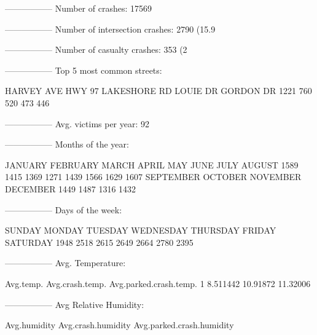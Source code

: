 \documentclass[11pt, a4paper]{article}
\begin{document}
\begin{Schunk}
\begin{Soutput}
-----------------
Number of crashes: 17569
\end{Soutput}
\begin{Soutput}
-----------------
Number of intersection crashes: 2790 (15.9%
\end{Soutput}
\begin{Soutput}
-----------------
Number of casualty crashes: 353 (2%
\end{Soutput}
\begin{Soutput}
-----------------
Top 5 most common streets:
\end{Soutput}
\begin{Soutput}
  HARVEY AVE       HWY 97 LAKESHORE RD     LOUIE DR    GORDON DR 
        1221          760          520          473          446 
\end{Soutput}
\begin{Soutput}
-----------------
Avg. victims per year: 92
\end{Soutput}
\begin{Soutput}
-----------------
Months of the year:
\end{Soutput}
\begin{Soutput}
  JANUARY  FEBRUARY     MARCH     APRIL       MAY      JUNE      JULY    AUGUST 
     1589      1415      1369      1271      1439      1566      1629      1607 
SEPTEMBER   OCTOBER  NOVEMBER  DECEMBER 
     1449      1487      1316      1432 
\end{Soutput}
\begin{Soutput}
-----------------
Days of the week:
\end{Soutput}
\begin{Soutput}
   SUNDAY    MONDAY   TUESDAY WEDNESDAY  THURSDAY    FRIDAY  SATURDAY 
     1948      2518      2615      2649      2664      2780      2395 
\end{Soutput}
\begin{Soutput}
-----------------
Avg. Temperature:
\end{Soutput}
\begin{Soutput}
  Avg.temp. Avg.crash.temp. Avg.parked.crash.temp.
1  8.511442        10.91872               11.32006
\end{Soutput}
\begin{Soutput}
-----------------
Avg Relative Humidity:
\end{Soutput}
\begin{Soutput}
  Avg.humidity Avg.crash.humidity Avg.parked.crash.humidity

\end{Soutput}
\end{Schunk}
\end{document}
